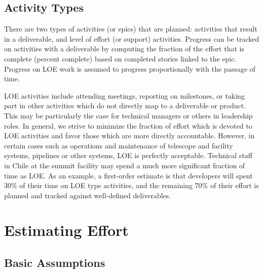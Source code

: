 \subsection{Activity Types}
\label{sec:loe}

There are two types of activities (or epics) that are planned:  activities that result in a deliverable, and level of effort (or support) activities.
Progress can be tracked on activities with a deliverable by computing the fraction of the effort that is complete (percent complete) based on completed stories linked to the \gls{epic}.
Progress on \gls{LOE} work is assumed to progress proportionally with the passage of time.

\gls{LOE} activities include attending meetings, reporting on milestones, or taking part in other activities which do not directly map to a deliverable or product.
This may be particularly the case for technical managers or others in leadership roles.
In general, we strive to minimize the fraction of effort which is devoted to \gls{LOE} activities and favor those which are more directly accountable.
However, in certain cases such as operations and maintenance of telescope and facility systems, pipelines or other systems, \gls{LOE} is perfectly acceptable.
Technical staff in Chile at the summit facility may spend a much more significant fraction of time as \gls{LOE}.
As an example, a first-order estimate is that developers will spent 30\% of their time on \gls{LOE} type activities, and the remaining 70\% of their effort is planned and tracked against well-defined deliverables.


\section{Estimating Effort}
\label{sec:effort}

\subsection{Basic Assumptions}


